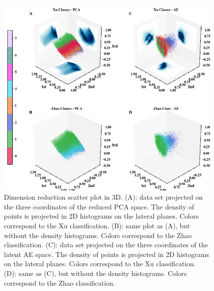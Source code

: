 \documentclass[utf8]{frontiersSCNS} %
\begin{document}
\begin{figure}[h!]
	\begin{center}
		\includegraphics[width=12cm]{Amaya/dimreduc}%
	\end{center}
	\caption{Dimension reduction scatter plot in 3D. (A): data set projected on the three coordinates of the reduced PCA space. The density of points is projected in 2D histograms on the lateral planes. Colors correspond to the Xu classification. (B): same plot as (A), but without the density histograms. Colors correspond to the Zhao classification. (C): data set projected on the three coordinates of the latent AE space. The density of points is projected in 2D histograms on the lateral planes. Colors correspond to the Xu classification. (D): same as (C), but without the density histograms. Colors correspond to the Zhao classification. }\label{fig:dimreduc}
\end{figure}
\end{document}
